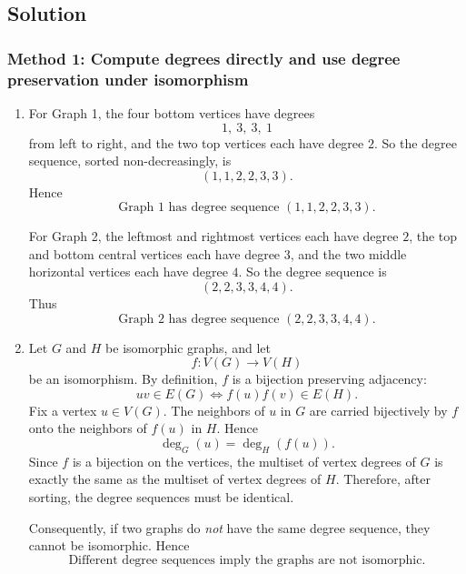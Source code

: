 \documentclass[12pt]{article}
\begin{document}
\subsection{Solution}

\subsubsection{Method 1: Compute degrees directly and use degree preservation under isomorphism}
\begin{enumerate}[label=(\alph*)]
\item For Graph 1, the four bottom vertices have degrees
\[
1,\ 3,\ 3,\ 1
\]
from left to right, and the two top vertices each have degree \(2\). So the degree sequence, sorted non-decreasingly, is
\[
(1,1,2,2,3,3).
\]
Hence
\[
\boxed{\text{Graph 1 has degree sequence }(1,1,2,2,3,3).}
\]

For Graph 2, the leftmost and rightmost vertices each have degree \(2\), the top and bottom central vertices each have degree \(3\), and the two middle horizontal vertices each have degree \(4\). So the degree sequence is
\[
(2,2,3,3,4,4).
\]
Thus
\[
\boxed{\text{Graph 2 has degree sequence }(2,2,3,3,4,4).}
\]

\newpage
\item Let \(G\) and \(H\) be isomorphic graphs, and let
\[
f:V(G)\to V(H)
\]
be an isomorphism. By definition, \(f\) is a bijection preserving adjacency:
\[
uv\in E(G)\iff f(u)f(v)\in E(H).
\]
Fix a vertex \(u\in V(G)\). The neighbors of \(u\) in \(G\) are carried bijectively by \(f\) onto the neighbors of \(f(u)\) in \(H\). Hence
\[
\deg_G(u)=\deg_H(f(u)).
\]
Since \(f\) is a bijection on the vertices, the multiset of vertex degrees of \(G\) is exactly the same as the multiset of vertex degrees of \(H\). Therefore, after sorting, the degree sequences must be identical.

Consequently, if two graphs do \emph{not} have the same degree sequence, they cannot be isomorphic. Hence
\[
\boxed{\text{Different degree sequences imply the graphs are not isomorphic.}}
\]
\end{enumerate}
\end{document}

